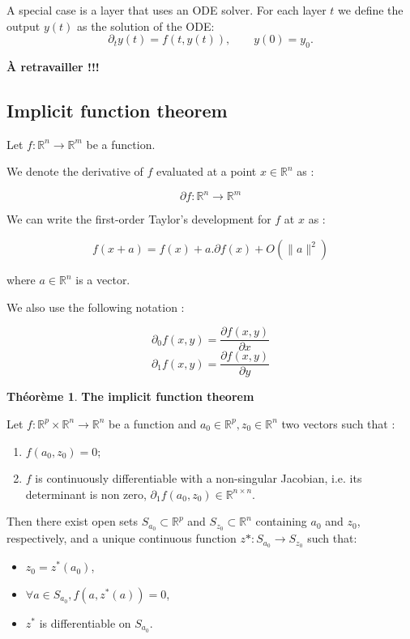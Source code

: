 \documentclass[10pt,a4paper]{article}
\theoremstyle{definition}
\theoremstyle{definition}
\newtheorem{theorem}{Théorème}
\begin{document}
A special case is a layer that uses an ODE solver. For each layer $t$ we define the output $y(t)$ as the solution of the ODE:
$$\partial_t y(t) = f(t, y(t)), \qquad y(0) = y_0.$$

\textbf{À retravailler !!!}

\subsection{Implicit function theorem}
Let $f: \mathbb{R}^n \rightarrow \mathbb{R}^m$ be a function.

We denote the derivative of $f$ evaluated at a point $x \in \mathbb{R}^n$ as :

\[ \partial f : \mathbb{R}^n \rightarrow \mathbb{R}^m \]

We can write the first-order Taylor's development for $f$ at $x$ as :

\[ f(x + a) = f(x) + a . \partial f(x) + O(\| a\|^2) \]


where $a \in \mathbb{R}^n$ is a vector.

We also use the following notation :

\[ \partial_0 f(x,y) = \frac{\partial f(x,y)}{\partial x}  \]
\[ \partial_1 f(x,y) = \frac{\partial f(x,y)}{\partial y}  \]

\begin{theorem}{\textbf{The implicit function theorem}}

Let $f: \mathbb{R}^p \times \mathbb{R}^n \rightarrow \mathbb{R}^n$ be a function and $a_0 \in \mathbb{R}^p , z_0 \in \mathbb{R}^n$ two vectors such that :

\begin{enumerate}
\item $f(a_0,z_0) = 0$;
\item $f$ is continuously differentiable with a non-singular Jacobian, i.e. its determinant is non zero, $\partial_1 f(a_0,z_0) \in \mathbb{R}^{n \times n}$.
\end{enumerate}
Then there exist open sets $S_{a_0} \subset \mathbb{R}^p$ and $S_{z_0} \subset \mathbb{R}^n$ containing $a_0$ and $z_0$, respectively, and a unique continuous function $z*:S_{a_0} \rightarrow S_{z_0}$ such that:
\begin{itemize}
\item $z_0=z^*(a_0)$,
\item $ \forall a \in S_{a_0}, f(a,z^*(a))=0$,
\item $z^*$ is differentiable on $S_{a_0}$.
\end{itemize}
\end{theorem}
\end{document}
